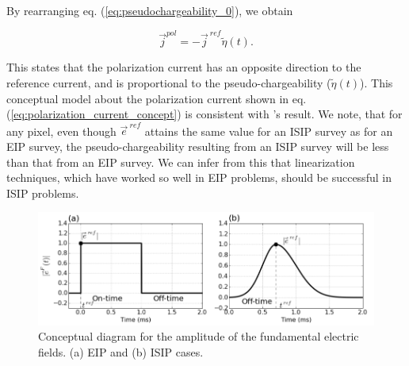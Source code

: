 \documentclass[letterpaper,11pt]{article}
\renewcommand {\j}  { {\vec j} }
\newcommand {\e}  { {\vec e} }
\newcommand{\peta}{\tilde{\eta}}
\newcommand{\eref}{\e^{\ ref}}
\newcommand{\jref}{\j^{\ ref}}
\begin{document}
By rearranging eq. (\ref{eq:pseudochargeability_0}), we obtain 
\begin{linenomath*}
\begin{equation}
  \j^{pol} = -\jref\peta(t). 
  \label{eq:polarization_current_concept}
\end{equation}
\end{linenomath*}
This states that the polarization current has an opposite direction to the reference current, and is proportional to the pseudo-chargeability ($\peta(t)$). 
This conceptual model about the polarization current shown in eq. (\ref{eq:polarization_current_concept}) is consistent with \cite{seigel1959}'s result. We note, that for any pixel, even though  $\eref$  attains the same value for an ISIP survey as for an EIP survey, the pseudo-chargeability resulting from  an ISIP survey  will be less than that from an EIP survey. We can infer from this that  linearization techniques, which  have worked so well in EIP problems, should be successful in ISIP problems. 
\begin{figure}  
  \includegraphics[width=1.0\textwidth]{figures/DCEM_F_current.png} 
  \caption{Conceptual diagram for the amplitude of the fundamental electric fields. (a) EIP and (b) ISIP cases.}
  \label{F:DCEM_F_current}
\end{figure}   
\end{document}
